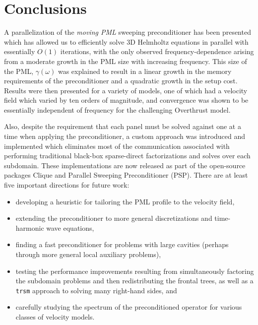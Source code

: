 \section{Conclusions}
A parallelization of the {\em moving PML} sweeping preconditioner has been 
presented which has allowed us to efficiently solve 3D Helmholtz equations in 
parallel with essentially $O(1)$ iterations, with 
the only observed frequency-dependence arising from a moderate growth in the 
PML size with increasing frequency. This size of the PML, $\gamma(\omega)$ 
was explained to result in a linear growth in the memory requirements of the
preconditioner and a quadratic growth in the setup cost. Results were then 
presented for a variety of models, one of which had a velocity field which 
varied by ten orders of magnitude, and convergence was shown to be essentially
independent of frequency for the challenging Overthrust model.

Also, despite the requirement that each panel must be solved against one at a 
time when applying the preconditioner, a custom approach was introduced and 
implemented which eliminates most of the communication associated with 
performing traditional black-box sparse-direct factorizations and solves 
over each subdomain. These implementations are now released as part of the 
open-source packages Clique and Parallel Sweeping Preconditioner (PSP). There 
are at least five important directions for future work:
\begin{itemize}
\item developing a heuristic for tailoring the PML profile to the 
      velocity field,
\item extending the preconditioner to more general discretizations and time-harmonic wave equations,
\item finding a fast preconditioner for problems with large cavities
      (perhaps through more general local auxiliary problems), 
\item testing the performance improvements resulting from simultaneously 
      factoring the subdomain problems and then redistributing the 
      frontal trees, as well as a \verb!trsm! approach to solving many 
      right-hand sides, and
\item carefully studying the spectrum of the preconditioned operator for 
      various classes of velocity models.
\end{itemize}


